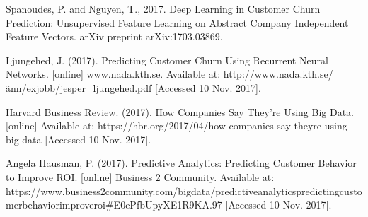 \documentclass[final,a4paper,peerreviewca]{IEEEtran}
\begin{document}
\begin{thebibliography}{99}
 Spanoudes, P. and Nguyen, T., 2017. Deep Learning in Customer Churn Prediction: Unsupervised Feature Learning on Abstract Company Independent Feature Vectors. arXiv preprint arXiv:1703.03869.

 Ljungehed, J. (2017). Predicting Customer Churn Using Recurrent Neural Networks. [online] www.nada.kth.se. Available at: http://www.nada.kth.se/\~ann/exjobb/jesper\_ljungehed.pdf [Accessed 10 Nov. 2017].

Harvard Business Review. (2017). How Companies Say They’re Using Big Data. [online] Available at: https://hbr.org/2017/04/how-companies-say-theyre-using-big-data [Accessed 10 Nov. 2017].

 Angela Hausman, P. (2017). Predictive Analytics: Predicting Customer Behavior to Improve ROI. [online] Business 2 Community. Available at: https://www.business2community.com/big\-data/predictive\-analytics\-predicting\-customer\-behavior\-improve\-roi\#E0ePfbUpyXE1R9KA.97 [Accessed 10 Nov. 2017].

\end{thebibliography}

\end{document}
